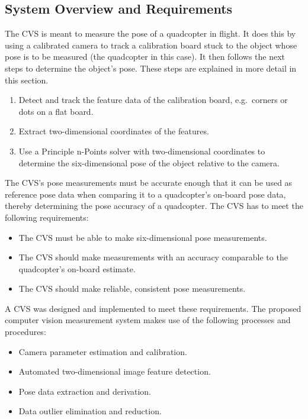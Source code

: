 \subsection{System Overview and Requirements}

The CVS is meant to measure the pose of a quadcopter in flight. It does this by using a calibrated camera to track a calibration board stuck to the object whose pose is to be measured (the quadcopter in this case). It then follows the next steps to determine the object's pose. These steps are explained in more detail in this section. 

\begin{enumerate}
  \item Detect and track the feature data of the calibration board, e.g.\ corners or dots on a flat board. 
  \item Extract two-dimensional coordinates of the features.
  \item Use a Principle n-Points solver with two-dimensional coordinates to determine the six-dimensional pose of the object relative to the camera. 
\end{enumerate}

The CVS's pose measurements must be accurate enough that it can be used as reference pose data when comparing it to a quadcopter's on-board pose data, thereby determining the pose accuracy of a quadcopter. The CVS has to meet the following requirements:

\begin{itemize}
  \item The CVS must be able to make six-dimensional pose measurements.
  \item The CVS should make measurements with an accuracy comparable to the quadcopter's on-board estimate.
  \item The CVS should make reliable, consistent pose measurements.
\end{itemize}

A CVS was designed and implemented to meet these requirements. The proposed computer vision measurement system makes use of the following processes and procedures: 

\begin{itemize}
  \item Camera parameter estimation and calibration.
  \item Automated two-dimensional image feature detection.
  \item Pose data extraction and derivation.
  \item Data outlier elimination and reduction. 
\end{itemize}

